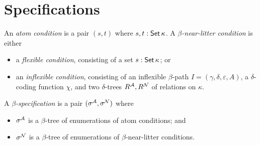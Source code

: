 \section{Specifications}
\begin{definition}
  \label{def:Spec}
  An \emph{atom condition} is a pair \( (s, t) \) where \( s, t : \operatorname{\mathsf{Set}} \kappa \).
  A \emph{\( \beta \)-near-litter condition} is either
  \begin{itemize}
    \item a \emph{flexible condition}, consisting of a set \( s : \operatorname{\mathsf{Set}} \kappa \); or
    \item an \emph{inflexible condition}, consisting of an inflexible \( \beta \)-path \( I = (\gamma,\delta,\varepsilon,A) \), a \( \delta \)-coding function \( \chi \), and two \( \delta \)-trees \( R^{\mathcal A}, R^{\mathcal N} \) of relations on \( \kappa \).
  \end{itemize}
  A \emph{\( \beta \)-specification} is a pair \( (\sigma^{\mathcal A}, \sigma^{\mathcal N}) \) where
  \begin{itemize}
    \item \( \sigma^{\mathcal A} \) is a \( \beta \)-tree of enumerations of atom conditions; and
    \item \( \sigma^{\mathcal N} \) is a \( \beta \)-tree of enumerations of \( \beta \)-near-litter conditions.
  \end{itemize}
\end{definition}
